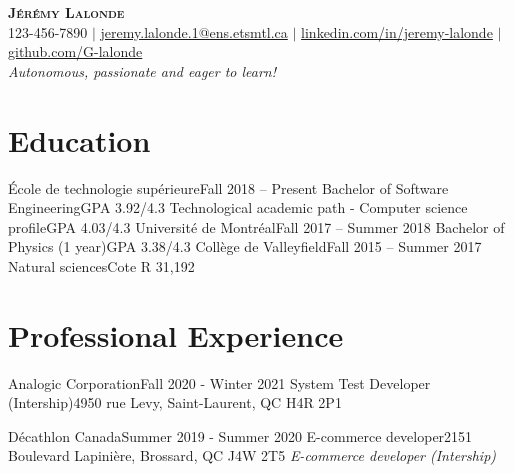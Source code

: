 \documentclass[letterpaper,11pt]{article}
\begin{document}
\begin{center}
  \textbf{\Huge \scshape Jérémy Lalonde} \\ \vspace{1pt}
  \small 123-456-7890 $|$ \href{mailto:jeremy.lalonde.1@ens.etsmtl.ca}{jeremy.lalonde.1@ens.etsmtl.ca} $|$ 
  \href{https://linkedin.com/in/jeremy-lalonde}{linkedin.com/in/jeremy-lalonde} $|$
  \href{https://github.com/G-lalonde}{github.com/G-lalonde} \\
  \textit{\small {Autonomous, passionate and eager to learn!}}
\end{center}

\section{Education}
  \resumeSubHeadingListStart
    \resumeSubheadingTwo 
      {École de technologie supérieure}{Fall 2018 -- Present}
      {Bachelor of Software Engineering}{GPA 3.92/4.3}
      {Technological academic path - Computer science profile}{GPA 4.03/4.3}
    \resumeSubheading
      {Université de Montréal}{Fall 2017 -- Summer 2018}
      {Bachelor of Physics (1 year)}{GPA 3.38/4.3}
    \resumeSubheading
      {Collège de Valleyfield}{Fall 2015 -- Summer 2017}
      {Natural sciences}{Cote R 31,192}
  \resumeSubHeadingListEnd

\section{Professional Experience}
  \resumeSubHeadingListStart

    \resumeSubheading
      {Analogic Corporation}{Fall 2020 - Winter 2021}
      {System Test Developer (Intership)}{4950 rue Levy, Saint-Laurent, QC H4R 2P1}
      \resumeItemListStart
      \resumeItemListEnd

    \resumeSubheading
      {Décathlon Canada}{Summer 2019 - Summer 2020}
      {E-commerce developer}{2151 Boulevard Lapinière, Brossard, QC J4W 2T5}
      \resumeItemListStart
      \resumeItemListEnd
      \textit{\small {E-commerce developer (Intership)}}\vspace{-7pt}
        \resumeItemListStart
        \resumeItemListEnd
\end{document}
